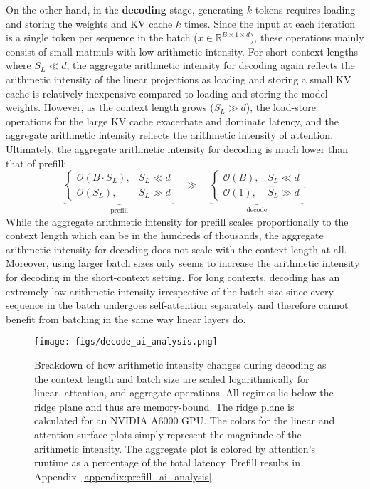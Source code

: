 On the other hand, in the \textbf{decoding} stage, generating $k$ tokens requires loading and storing the weights and KV cache $k$ times. Since the input at each iteration is a single token per sequence in the batch ($x\in\mathbb{R}^{B\times 1\times d}$), these operations mainly consist of small matmuls with low arithmetic intensity. For short context lengths where $S_L \ll d$, the aggregate arithmetic intensity for decoding again reflects the arithmetic intensity of the linear projections as loading and storing a small KV cache is relatively inexpensive compared to loading and storing the model weights. However, as the context length grows ($S_L \gg d$), the load-store operations for the large KV cache exacerbate and dominate latency, and the aggregate arithmetic intensity reflects the arithmetic intensity of attention. Ultimately, the aggregate arithmetic intensity for decoding is much lower than that of prefill:
\[
\underbrace{
\begin{cases}
    \mathcal{O}(B \cdot S_L), & S_L \ll d \\
    \mathcal{O}(S_L), & S_L \gg d
\end{cases}}_{\text{prefill}}
\quad \gg \quad
\underbrace{
\begin{cases}
    \mathcal{O}(B), & S_L \ll d \\
    \mathcal{O}(1), & S_L \gg d
\end{cases}}_{\text{decode}}.
\]
While the aggregate arithmetic intensity for prefill scales proportionally to the context length which can be in the hundreds of thousands, the aggregate arithmetic intensity for decoding does not scale with the context length at all. Moreover, using larger batch sizes only seems to increase the arithmetic intensity for decoding in the short-context setting. For long contexts, decoding has an extremely low arithmetic intensity irrespective of the batch size since every sequence in the batch undergoes self-attention separately and therefore cannot benefit from batching in the same way linear layers do.

\begin{figure*}[t]
    \centering
    \texttt{[image: figs/decode\_ai\_analysis.png]}
    \caption{Breakdown of how arithmetic intensity changes during decoding as the context length and batch size are scaled logarithmically for linear, attention, and aggregate operations. All regimes lie below the ridge plane and thus are memory-bound. The ridge plane is calculated for an NVIDIA A6000 GPU. The colors for the linear and attention surface plots simply represent the magnitude of the arithmetic intensity. The aggregate plot is colored by attention's runtime as a percentage of the total latency. Prefill results in Appendix~\ref{appendix:prefill_ai_analysis}.}
    \label{fig:decode_arithmetic_intensity_analysis}
\end{figure*}

